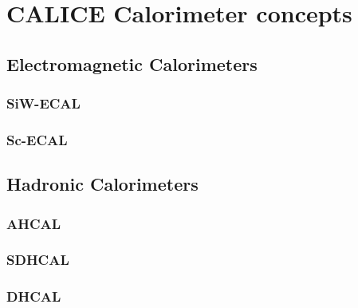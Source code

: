 \chapter{CALICE Calorimeter concepts}

\section{Electromagnetic Calorimeters}

\subsection{SiW-ECAL}
\subsection{Sc-ECAL}

\section{Hadronic Calorimeters}

\subsection{AHCAL}
\subsection{SDHCAL}
\subsection{DHCAL}
